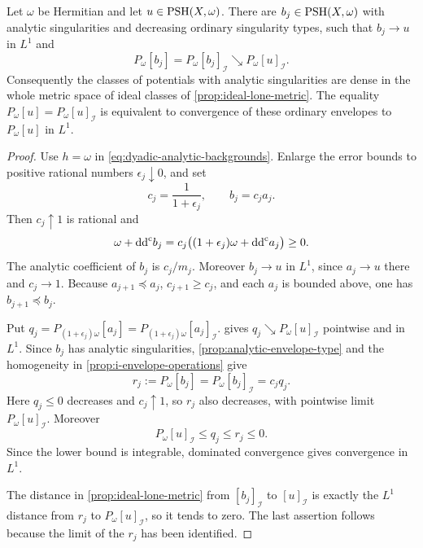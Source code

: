 \begin{corollary}\label{cor:fixed-hermitian-analytic-density}
Let $\omega$ be Hermitian and let $u\in\mathrm{PSH}(X,\omega)$. There are $b_j\in\mathrm{PSH}(X,\omega)$ with analytic singularities and decreasing ordinary singularity types, such that $b_j\to u$ in $L^1$ and
\[
 P_\omega[b_j]=P_\omega[b_j]_{\mathcal I}\searrow P_\omega[u]_{\mathcal I}.
\]
Consequently the classes of potentials with analytic singularities are dense in the whole metric space of ideal classes of \cref{prop:ideal-lone-metric}. The equality $P_\omega[u]=P_\omega[u]_{\mathcal I}$ is equivalent to convergence of these ordinary envelopes to $P_\omega[u]$ in $L^1$.
\end{corollary}
\begin{proof}
Use $h=\omega$ in \eqref{eq:dyadic-analytic-backgrounds}. Enlarge the error bounds to positive rational numbers $\epsilon_j\downarrow0$, and set
\[
 c_j=\frac1{1+\epsilon_j},\qquad b_j=c_ja_j.
\]
Then $c_j\uparrow1$ is rational and
\[
 \omega+\mathrm{dd}^{\mathrm{c}} b_j
 =c_j\bigl((1+\epsilon_j)\omega+\mathrm{dd}^{\mathrm{c}} a_j\bigr)\geq0.
\]
The analytic coefficient of $b_j$ is $c_j/m_j$. Moreover $b_j\to u$ in $L^1$, since $a_j\to u$ there and $c_j\to1$. Because $a_{j+1}\preceq a_j$, $c_{j+1}\geq c_j$, and each $a_j$ is bounded above, one has $b_{j+1}\preceq b_j$.

Put $q_j=P_{(1+\epsilon_j)\omega}[a_j]=P_{(1+\epsilon_j)\omega}[a_j]_{\mathcal I}$.  gives $q_j\searrow P_\omega[u]_{\mathcal I}$ pointwise and in $L^1$. Since $b_j$ has analytic singularities, \cref{prop:analytic-envelope-type} and the homogeneity in \cref{prop:i-envelope-operations} give
\[
 r_j:=P_\omega[b_j]=P_\omega[b_j]_{\mathcal I}=c_jq_j.
\]
Here $q_j\leq0$ decreases and $c_j\uparrow1$, so $r_j$ also decreases, with pointwise limit $P_\omega[u]_{\mathcal I}$. Moreover
\[
 P_\omega[u]_{\mathcal I}\leq q_j\leq r_j\leq0.
\]
Since the lower bound is integrable, dominated convergence gives convergence in $L^1$.

The distance in \cref{prop:ideal-lone-metric} from $[b_j]_{\mathcal I}$ to $[u]_{\mathcal I}$ is exactly the $L^1$ distance from $r_j$ to $P_\omega[u]_{\mathcal I}$, so it tends to zero. The last assertion follows because the limit of the $r_j$ has been identified.
\end{proof}
